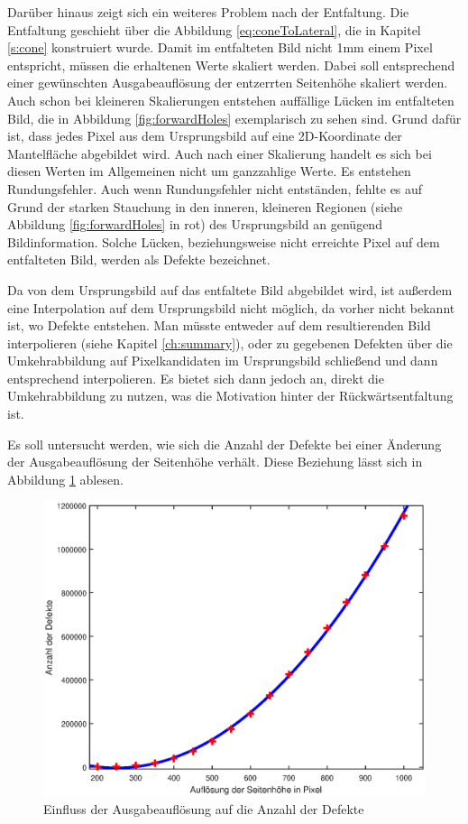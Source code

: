 Darüber hinaus zeigt sich ein weiteres Problem nach der Entfaltung. Die Entfaltung geschieht über die Abbildung \ref{eq:coneToLateral}, die in Kapitel \ref{s:cone} konstruiert wurde.
Damit im entfalteten Bild nicht 1mm einem Pixel entspricht, müssen die erhaltenen Werte skaliert werden. Dabei soll entsprechend einer gewünschten Ausgabeauflösung der entzerrten Seitenhöhe skaliert werden.
Auch schon bei kleineren Skalierungen entstehen auffällige Lücken im entfalteten Bild, die in Abbildung \ref{fig:forwardHoles} exemplarisch zu sehen sind. Grund dafür ist, dass jedes Pixel aus dem Ursprungsbild auf eine 2D-Koordinate der Mantelfläche abgebildet wird. Auch nach einer Skalierung handelt es sich bei diesen Werten im Allgemeinen nicht um ganzzahlige Werte. Es entstehen Rundungsfehler. Auch wenn Rundungsfehler nicht entständen, fehlte es auf Grund der starken Stauchung in den inneren, kleineren Regionen (siehe Abbildung \ref{fig:forwardHoles} in rot) des Ursprungsbild an genügend Bildinformation. Solche Lücken, beziehungsweise nicht erreichte Pixel auf dem entfalteten Bild, werden als Defekte bezeichnet.

Da von dem Ursprungsbild auf das entfaltete Bild abgebildet wird, ist außerdem eine Interpolation auf dem Ursprungsbild nicht möglich, da vorher nicht bekannt ist, wo Defekte entstehen. Man müsste entweder auf dem resultierenden Bild interpolieren (siehe Kapitel \ref{ch:summary}), oder zu gegebenen Defekten über die Umkehrabbildung auf Pixelkandidaten im Ursprungsbild schließend und dann entsprechend interpolieren.
Es bietet sich dann jedoch an, direkt die Umkehrabbildung zu nutzen, was die Motivation hinter der Rückwärtsentfaltung ist.

Es soll untersucht werden, wie sich die Anzahl der Defekte bei einer Änderung der Ausgabeauflösung der Seitenhöhe verhält. Diese Beziehung lässt sich in Abbildung \ref{fig:influenceRes} ablesen.
\begin{figure}[!htb]
	\centering
	\includegraphics[width=\textwidth]{images/numberOfHoles.eps}
	\caption{Einfluss der Ausgabeauflösung auf die Anzahl der Defekte}
	\label{fig:influenceRes}
\end{figure}

